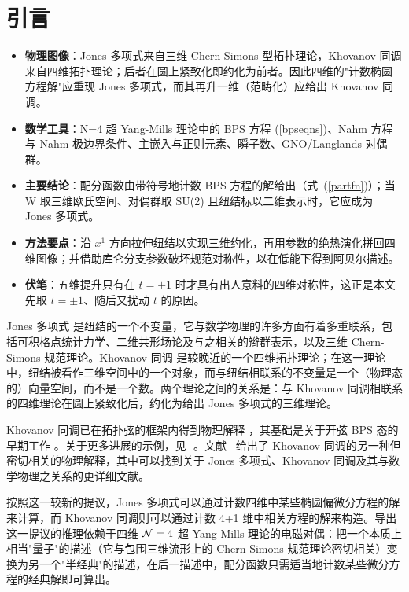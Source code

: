 \section{引言}

\begin{keytakeaways}
\begin{itemize}\setlength{\itemsep}{2pt}
  \item \textbf{物理图像}：Jones 多项式来自三维 Chern-Simons 型拓扑理论，Khovanov 同调来自四维拓扑理论；后者在圆上紧致化即约化为前者。因此四维的"计数椭圆方程解"应重现 Jones 多项式，而其再升一维（范畴化）应给出 Khovanov 同调。
  \item \textbf{数学工具}：N=4 超 Yang-Mills 理论中的 BPS 方程 (\ref{bpseqns})、Nahm 方程与 Nahm 极边界条件、主嵌入与正则元素、瞬子数、GNO/Langlands 对偶群。
  \item \textbf{主要结论}：配分函数由带符号地计数 BPS 方程的解给出（式~(\ref{partfn})）；当 W 取三维欧氏空间、对偶群取 SU(2) 且纽结标以二维表示时，它应成为 Jones 多项式。
  \item \textbf{方法要点}：沿 $x^1$ 方向拉伸纽结以实现三维约化，再用参数的绝热演化拼回四维图像；并借助库仑分支参数破坏规范对称性，以在低能下得到阿贝尔描述。
  \item \textbf{伏笔}：五维提升只有在 $t=\pm1$ 时才具有出人意料的四维对称性，这正是本文先取 $t=\pm1$、随后又扰动 $t$ 的原因。
\end{itemize}
\end{keytakeaways}

Jones 多项式 \cite{Jones} 是纽结的一个不变量，它与数学物理的许多方面有着多重联系，包括可积格点统计力学、二维共形场论及与之相关的辫群表示，以及三维 Chern-Simons 规范理论。Khovanov 同调 \cite{Khovanov} 是较晚近的一个四维拓扑理论；在这一理论中，纽结被看作三维空间中的一个对象，而与纽结相联系的不变量是一个（物理态的）向量空间，而不是一个数。两个理论之间的关系是：与 Khovanov 同调相联系的四维理论在圆上紧致化后，约化为给出 Jones 多项式的三维理论。

Khovanov 同调已在拓扑弦的框架内得到物理解释 \cite{GSV}，其基础是关于开弦 BPS 态的早期工作 \cite{OV}。关于更多进展的示例，见 \nocite{LMV,NV,Ma,DGR,DVV,AY,CNV,ACDKV,AgS} \cite{LMV}-\cite{AgS}。文献~\cite{fiveknots} 给出了 Khovanov 同调的另一种但密切相关的物理解释，其中可以找到关于 Jones 多项式、Khovanov 同调及其与数学物理之关系的更详细文献。

按照这一较新的提议，Jones 多项式可以通过计数四维中某些椭圆偏微分方程的解来计算，而 Khovanov 同调则可以通过计数 4+1 维中相关方程的解来构造。导出这一提议的推理依赖于四维 ${\mathcal N}=4$ 超 Yang-Mills 理论的电磁对偶：把一个本质上相当"量子"的描述（它与包围三维流形上的 Chern-Simons 规范理论密切相关）变换为另一个"半经典"的描述，在后一描述中，配分函数只需适当地计数某些微分方程的经典解即可算出。

